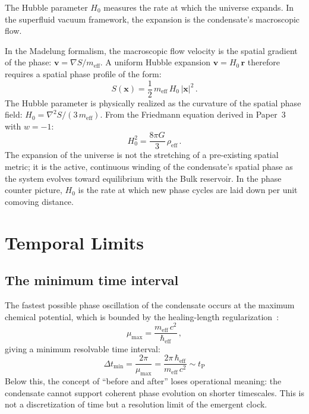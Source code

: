 \documentclass[12pt, a4paper]{article}
\newcommand{\meff}{m_{\mathrm{eff}}}
\newcommand{\heff}{\hbar_{\mathrm{eff}}}
\newcommand{\tP}{t_{\mathrm{P}}}
\begin{document}
The Hubble parameter $H_0$ measures the rate at
which the universe expands. In the superfluid vacuum
framework, the expansion is the condensate's
macroscopic flow.

In the Madelung formalism, the macroscopic flow
velocity is the spatial gradient of the phase:
$\mathbf{v} = \nabla S / \meff$. A uniform Hubble
expansion $\mathbf{v} = H_0\,\mathbf{r}$ therefore
requires a spatial phase profile of the form:
\begin{equation}
    S(\mathbf{x})
    = \frac{1}{2}\,\meff\,H_0\,|\mathbf{x}|^2\,.
\label{eq:S_hubble}
\end{equation}
The Hubble parameter is physically realized as the
curvature of the spatial phase field: $H_0 =
\nabla^2 S / (3\,\meff)$. From the Friedmann
equation derived in
Paper~3~\cite{kulangiev_2026c} with $w = -1$:
\begin{equation}
    H_0^2 = \frac{8\pi G}{3}\,\rho_{\mathrm{eff}}\,.
\end{equation}
The expansion of the universe is not the stretching
of a pre-existing spatial metric; it is the active,
continuous winding of the condensate's spatial phase
as the system evolves toward equilibrium with the
Bulk reservoir. In the phase counter picture, $H_0$
is the rate at which new phase cycles are laid down
per unit comoving distance.


\section{Temporal Limits}
\label{sec:limits}

\subsection{The minimum time interval}

The fastest possible phase oscillation of the
condensate occurs at the maximum chemical potential,
which is bounded by the healing-length
regularization~\cite{kulangiev_2026e}:
\begin{equation}
    \mu_{\max} = \frac{\meff\,c^2}{\heff}\,,
\end{equation}
giving a minimum resolvable time interval:
\begin{equation}
    \boxed{\;\Delta t_{\min}
    = \frac{2\pi}{\mu_{\max}}
    = \frac{2\pi\,\heff}{\meff\,c^2}
    \sim \tP\;}
\label{eq:dt_min}
\end{equation}
Below this, the concept of ``before and after''
loses operational meaning: the condensate cannot
support coherent phase evolution on shorter
timescales. This is not a discretization of time
but a resolution limit of the emergent clock.
\end{document}
